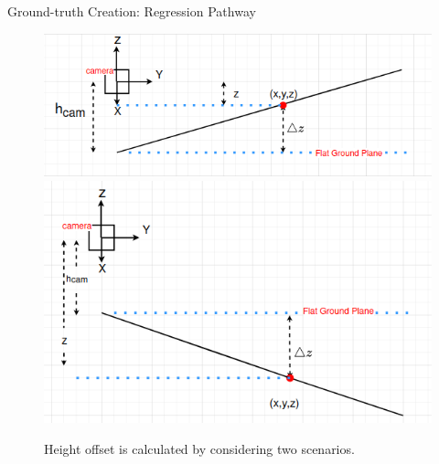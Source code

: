 \documentclass[aspectratio=169]{beamer}
\begin{document}
\begin{frame}{Ground-truth Creation: Regression Pathway}
    \begin{figure}[h]
      \caption{Height offset is calculated by considering two scenarios.}
        \centering
        \includegraphics[scale=0.2]{images/delta_z_uphill.png} 
        \includegraphics[scale=0.2]{images/delat_z_downhill.png}
        \end{figure}
\end{frame}
\end{document}
